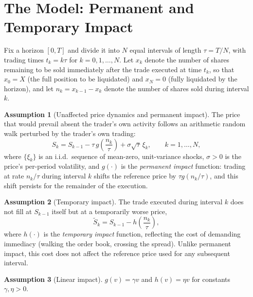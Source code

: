 \documentclass[11pt]{article}
\theoremstyle{remark}
\theoremstyle{definition}
\newtheorem{assumption}{Assumption}
\begin{document}
\section{The Model: Permanent and Temporary Impact}
\label{sec:model}

Fix a horizon $[0,T]$ and divide it into $N$ equal intervals of length $\tau=T/N$, with trading times $t_k=k\tau$ for $k=0,1,\ldots,N$. Let $x_k$ denote the number of shares remaining to be sold immediately after the trade executed at time $t_k$, so that $x_0=X$ (the full position to be liquidated) and $x_N=0$ (fully liquidated by the horizon), and let $n_k=x_{k-1}-x_k$ denote the number of shares sold during interval $k$.

\begin{assumption}[Unaffected price dynamics and permanent impact]
\label{ass:permanent}
The price that would prevail absent the trader's own activity follows an arithmetic random walk perturbed by the trader's own trading:
\begin{equation}
S_k = S_{k-1} - \tau\, g\!\left(\frac{n_k}{\tau}\right) + \sigma\sqrt{\tau}\,\xi_k, \qquad k=1,\dots,N,
\label{eq:price}
\end{equation}
where $\{\xi_k\}$ is an i.i.d.\ sequence of mean-zero, unit-variance shocks, $\sigma>0$ is the price's per-period volatility, and $g(\cdot)$ is the \emph{permanent impact} function: trading at rate $n_k/\tau$ during interval $k$ shifts the reference price by $\tau g(n_k/\tau)$, and this shift persists for the remainder of the execution.
\end{assumption}

\begin{assumption}[Temporary impact]
\label{ass:temporary}
The trade executed during interval $k$ does not fill at $S_{k-1}$ itself but at a temporarily worse price,
\begin{equation}
\tilde S_k = S_{k-1} - h\!\left(\frac{n_k}{\tau}\right),
\label{eq:execprice}
\end{equation}
where $h(\cdot)$ is the \emph{temporary impact} function, reflecting the cost of demanding immediacy (walking the order book, crossing the spread). Unlike permanent impact, this cost does not affect the reference price used for any subsequent interval.
\end{assumption}

\begin{assumption}[Linear impact]
\label{ass:linear}
$g(v)=\gamma v$ and $h(v)=\eta v$ for constants $\gamma,\eta>0$.
\end{assumption}
\end{document}
